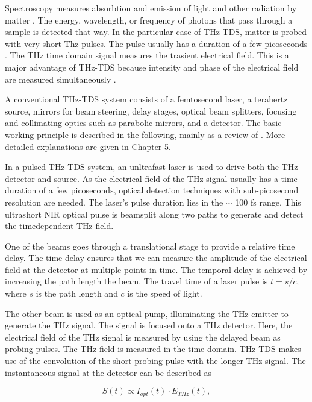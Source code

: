Spectroscopy measures absorbtion and emission of light and other radiation by matter \cite{atascientificUnderstandingSpectrometrySpectroscopy2020}. The energy, wavelength, or frequency of photons that pass through a sample is detected that way. In the particular case of THz-TDS, matter is probed with very short Thz pulses.
The pulse usually has a duration of a few picoseconds \cite{neuTutorialIntroductionTerahertz2018}. The THz time domain signal measures the trasient electrical field. This is a major advantage of THz-TDS because intensity and phase of the electrical field are measured simultaneously \cite{zhaoPrincipleTerahertzTimeDomain2023}.

A conventional THz-TDS system consists of a femtosecond laser, a terahertz source, mirrors for beam steering, delay stages, optical beam splitters, focusing and collimating optics such as parabolic mirrors, and a detector. The basic working principle is described in the following, mainly as a review of \cite{neuTutorialIntroductionTerahertz2018,PrinciplesTerahertzScience2009}. More detailed explanations are given in Chapter 5.


In a pulsed THz-TDS system, an unltrafast laser is used to drive both the THz detector and source. As the electrical field of the THz signal usually has a time duration of a few picoseconds, optical detection techniques with sub-picosecond resolution are needed. The laser's pulse duration lies in the $\sim$ \num{100} \si{\femto\s} range. This ultrashort NIR optical pulse is beamsplit along two paths to generate and detect the timedependent THz field. 

One of the beams goes through a translational stage to provide a relative time delay. The time delay ensures that we can measure the amplitude of the electrical field at the detector at multiple points in time. The temporal delay is achieved by increasing the path length the beam. The travel time of a laser pulse is $t = s/c$, where $s$ is the path length and $c$ is the speed of light. 

The other beam is used as an optical pump, illuminating the THz emitter to generate the THz signal. The signal is focused onto a THz detector. Here, the electrical field of the THz signal is measured by using the delayed beam as probing pulses. The THz field is measured in the time-domain. THz-TDS makes use of the convolution of the short probing pulse with the longer THz signal. The instantaneous signal at the detector can be described as 

\begin{equation}
	S(t) \propto I_{opt}(t)\cdot E_{THz}(t),
\end{equation}

